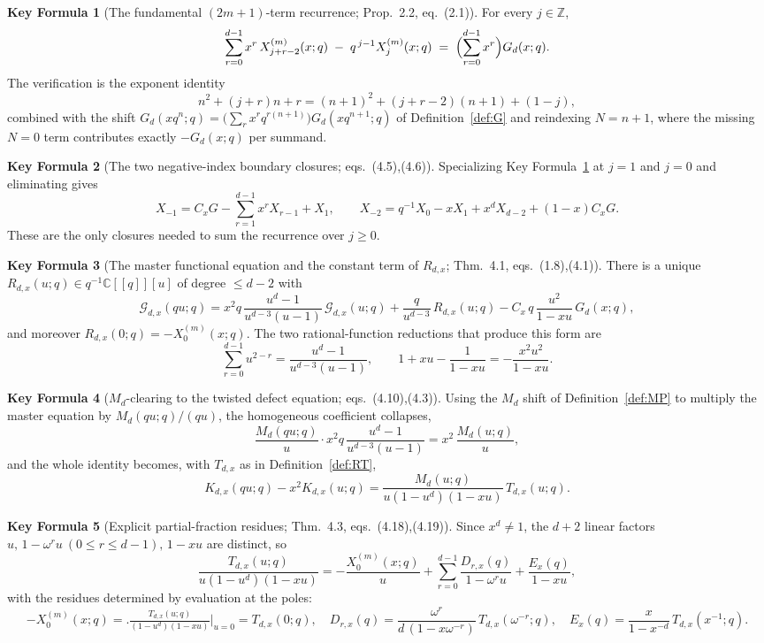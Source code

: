 \documentclass[11pt]{article}
\newcommand{\C}{\mathbb{C}}
\newcommand{\Z}{\mathbb{Z}}
\newcommand{\GG}{\mathcal{G}}
\theoremstyle{definition}
\newtheorem{keyformula}{Key Formula}
\begin{document}
\begin{keyformula}[The fundamental $(2m+1)$-term recurrence; Prop.~2.2, eq.~(2.1)]\label{KF:recurrence}
For every $j\in\Z$,
\[
\sum_{r=0}^{d-1}x^r\,X_{j+r-2}^{(m)}(x;q)\;-\;q^{\,j-1}X_j^{(m)}(x;q)
\;=\;\Bigl(\sum_{r=0}^{d-1}x^r\Bigr)G_d(x;q).
\]
The verification is the exponent identity
\[
n^2+(j+r)n+r=(n+1)^2+(j+r-2)(n+1)+(1-j),
\]
combined with the shift $G_d(xq^n;q)=\bigl(\sum_r x^rq^{r(n+1)}\bigr)G_d(xq^{n+1};q)$ of
Definition~\ref{def:G} and reindexing $N=n+1$, where the missing $N=0$ term contributes
exactly $-G_d(x;q)$ per summand.
\end{keyformula}

\begin{keyformula}[The two negative-index boundary closures; eqs.~(4.5),(4.6)]\label{KF:boundary}
Specializing Key Formula~\ref{KF:recurrence} at $j=1$ and $j=0$ and eliminating gives
\[
X_{-1}=C_xG-\sum_{r=1}^{d-1}x^rX_{r-1}+X_1,
\qquad
X_{-2}=q^{-1}X_0-xX_1+x^dX_{d-2}+(1-x)C_xG .
\]
These are the only closures needed to sum the recurrence over $j\ge0$.
\end{keyformula}

\begin{keyformula}[The master functional equation and the constant term of $R_{d,x}$; Thm.~4.1, eqs.~(1.8),(4.1)]\label{KF:functional}
There is a unique $R_{d,x}(u;q)\in q^{-1}\C[[q]][u]$ of degree $\le d-2$ with
\[
\GG_{d,x}(qu;q)
=x^2q\,\frac{u^d-1}{u^{d-3}(u-1)}\,\GG_{d,x}(u;q)
+\frac{q}{u^{d-3}}\,R_{d,x}(u;q)
-C_x\,q\,\frac{u^2}{1-xu}\,G_d(x;q),
\]
and moreover $R_{d,x}(0;q)=-X_0^{(m)}(x;q)$. The two rational-function reductions that produce
this form are
\[
\sum_{r=0}^{d-1}u^{2-r}=\frac{u^d-1}{u^{d-3}(u-1)},
\qquad
1+xu-\frac{1}{1-xu}=-\frac{x^2u^2}{1-xu}.
\]
\end{keyformula}

\begin{keyformula}[$M_d$-clearing to the twisted defect equation; eqs.~(4.10),(4.3)]\label{KF:defect}
Using the $M_d$ shift of Definition~\ref{def:MP} to multiply the master equation by
$M_d(qu;q)/(qu)$, the homogeneous coefficient collapses,
\[
\frac{M_d(qu;q)}{u}\cdot x^2q\,\frac{u^d-1}{u^{d-3}(u-1)}=x^2\,\frac{M_d(u;q)}{u},
\]
and the whole identity becomes, with $T_{d,x}$ as in Definition~\ref{def:RT},
\[
K_{d,x}(qu;q)-x^2K_{d,x}(u;q)
=\frac{M_d(u;q)}{u(1-u^d)(1-xu)}\,T_{d,x}(u;q).
\]
\end{keyformula}

\begin{keyformula}[Explicit partial-fraction residues; Thm.~4.3, eqs.~(4.18),(4.19)]\label{KF:residues}
Since $x^d\ne1$, the $d+2$ linear factors $u,\,1-\omega^ru\ (0\le r\le d-1),\,1-xu$ are distinct, so
\[
\frac{T_{d,x}(u;q)}{u(1-u^d)(1-xu)}
=-\frac{X_0^{(m)}(x;q)}{u}
+\sum_{r=0}^{d-1}\frac{D_{r,x}(q)}{1-\omega^ru}
+\frac{E_x(q)}{1-xu},
\]
with the residues determined by evaluation at the poles:
\[
-X_0^{(m)}(x;q)=\bigl.\tfrac{T_{d,x}(u;q)}{(1-u^d)(1-xu)}\bigr|_{u=0}=T_{d,x}(0;q),
\quad
D_{r,x}(q)=\frac{\omega^r}{d\,(1-x\omega^{-r})}\,T_{d,x}(\omega^{-r};q),
\quad
E_x(q)=\frac{x}{1-x^{-d}}\,T_{d,x}(x^{-1};q).
\]
\end{keyformula}
\end{document}
